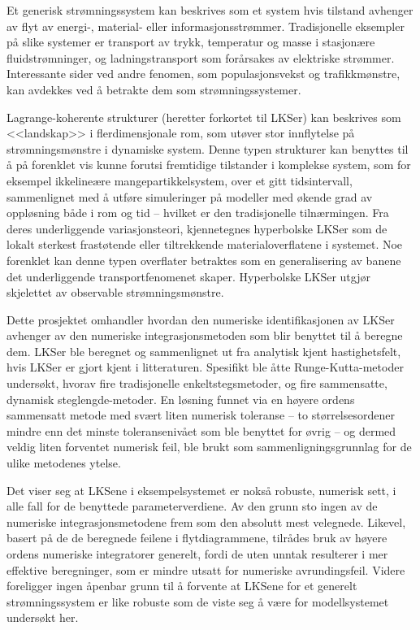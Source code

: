 Et generisk strømningssystem kan beskrives som et system hvis tilstand
avhenger av flyt av energi-, material- eller informasjonsstrømmer. Tradisjonelle
eksempler på slike systemer er transport av trykk, temperatur og masse i
stasjonære fluidstrømninger, og ladningstransport som forårsakes av elektriske
strømmer. Interessante sider ved andre fenomen, som populasjonsvekst og
trafikkmønstre, kan avdekkes ved å betrakte dem som strømningssystemer.

Lagrange-koherente strukturer (heretter forkortet til LKSer) kan beskrives som
<<landskap>> i flerdimensjonale rom, som utøver stor innflytelse på
strømningsmønstre i dynamiske system. Denne typen strukturer kan benyttes til
å på forenklet vis kunne forutsi fremtidige tilstander i komplekse system, som
for eksempel ikkelineære mangepartikkelsystem, over et gitt tidsintervall,
sammenlignet med å utføre simuleringer på modeller med økende grad av
oppløsning både i rom og tid -- hvilket er den tradisjonelle tilnærmingen. Fra
deres underliggende variasjonsteori, kjennetegnes hyperbolske LKSer som de
lokalt sterkest frastøtende eller tiltrekkende materialoverflatene i systemet.
Noe forenklet kan denne typen overflater betraktes som en generalisering av
banene det underliggende transportfenomenet skaper. Hyperbolske LKSer utgjør
skjelettet av observable strømningsmønstre.

Dette prosjektet omhandler hvordan den numeriske identifikasjonen av LKSer
avhenger av den numeriske integrasjonsmetoden som blir benyttet til å beregne
dem. LKSer ble beregnet og sammenlignet ut fra analytisk
kjent hastighetsfelt, hvis LKSer er gjort kjent i litteraturen. Spesifikt
ble åtte Runge-Kutta-metoder undersøkt, hvorav fire tradisjonelle
enkeltstegsmetoder, og fire sammensatte, dynamisk steglengde-metoder. En
løsning funnet via en høyere ordens sammensatt metode med svært liten
numerisk toleranse -- to størrelsesordener mindre enn det minste toleransenivået
som ble benyttet for
øvrig -- og dermed veldig liten forventet numerisk feil, ble brukt som
sammenligningsgrunnlag for de ulike metodenes ytelse.

Det viser seg at LKSene i eksempelsystemet er nokså robuste, numerisk sett,
i alle fall for de benyttede parameterverdiene. Av den grunn sto ingen av de
numeriske integrasjonsmetodene frem som den absolutt mest
velegnede. Likevel, basert på de de beregnede feilene i flytdiagrammene,
tilrådes bruk av høyere ordens numeriske integratorer generelt, fordi de uten
unntak resulterer i mer effektive beregninger,
som er mindre utsatt for numeriske avrundingsfeil. Videre foreligger ingen
åpenbar grunn til å forvente at LKSene for et generelt strømningssystem er like
robuste som de viste seg å være for modellsystemet undersøkt her.

